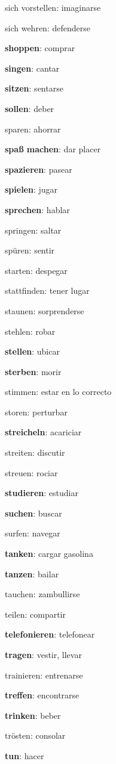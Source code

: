 \begin{multicols}{2}
\begin{myitemize}
\item sich vorstellen: imaginarse
\item sich wehren: defenderse
\item \textbf{shoppen}: comprar
\item \textbf{singen}: cantar
\item \textbf{sitzen}: sentarse
\item \textbf{sollen}: deber
\item sparen: ahorrar
\item \textbf{spaß machen}: dar placer
\item \textbf{spazieren}: pasear
\item \textbf{spielen}: jugar
\item \textbf{sprechen}: hablar
\item springen: saltar
\item spüren: sentir
\item starten: despegar
\item stattfinden: tener lugar
\item staunen: sorprenderse
\item stehlen: robar
\item \textbf{stellen}: ubicar
\item \textbf{sterben}: morir
\item stimmen: estar en lo correcto
\item storen: perturbar
\item \textbf{streicheln}: acariciar
\item streiten: discutir
\item streuen: rociar
\item \textbf{studieren}: estudiar
\item \textbf{suchen}: buscar
\item surfen: navegar
\item \textbf{tanken}: cargar gasolina
\item \textbf{tanzen}: bailar
\item tauchen: zambullirse
\item teilen: compartir
\item \textbf{telefonieren}: telefonear
\item \textbf{tragen}: vestir, llevar
\item trainieren: entrenarse
\item \textbf{treffen}: encontrarse
\item \textbf{trinken}: beber
\item trösten: consolar
\item \textbf{tun}: hacer

\end{myitemize}
\end{multicols}
